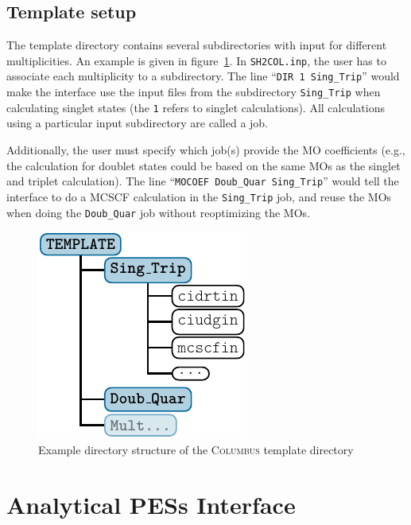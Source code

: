 \documentclass[a4paper,11pt,DIV=15,openany,twoside=false]{scrbook}
\newcommand{\ttt}[1]{\texttt{#1}}
\begin{document}
\subsection{Template setup}\label{int:col:template}

The template directory contains several subdirectories with input for different multiplicities. An example is given in figure~\ref{fig:dirs_COLtemp}. In \ttt{SH2COL.inp}, the user has to associate each multiplicity to a subdirectory. The line ``\ttt{DIR 1 Sing\_Trip}'' would make the interface use the input files from the subdirectory \ttt{Sing\_Trip} when calculating singlet states (the \ttt{1} refers to singlet calculations). All calculations using a particular input subdirectory are called a job.

Additionally, the user must specify which job(s) provide the MO coefficients (e.g., the calculation for doublet states could be based on the same MOs as the singlet and triplet calculation). The line ``\ttt{MOCOEF Doub\_Quar Sing\_Trip}'' would tell the interface to do a MCSCF calculation in the \ttt{Sing\_Trip} job, and reuse the MOs when doing the \ttt{Doub\_Quar} job without reoptimizing the MOs.

\begin{figure}[h!]
  \centering
  \includegraphics[scale=1]{img/dirs_COLtemp/dirs_COLtemp.pdf}
  \caption{Example directory structure of the \textsc{Columbus} template directory}
  \label{fig:dirs_COLtemp}
\end{figure}







\section{Analytical PESs Interface}\label{sec:int:analytical}
\end{document}
